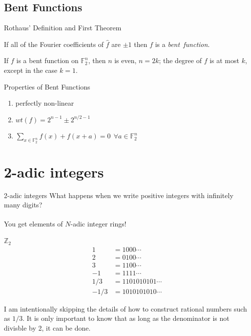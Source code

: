 \documentclass{beamer}
\def\zzz{\mathbb{Z}}
\def\gftwo{\mathbb{F}_2}
\begin{document}
\subsection{Bent Functions}
\begin{frame}{Rothaus' Definition and First Theorem}
  \begin{definition}\label{def:bent-function}
    If all of the Fourier coefficients of $\hat{f}$ are $\pm1$ then
    $f$ is a {\em bent\ function}.
  \end{definition}
  \begin{theorem}\label{thm:deg-of-bent-function}
  	If $f$ is a bent function on $\gftwo^n$, then $n$ is even, $n=2k$;
  	the degree of $f$ is at most $k$, except in the case $k=1$.
  \end{theorem}
\end{frame}

\begin{frame}{Properties of Bent Functions}
  \begin{enumerate}[1.]
    \item perfectly non-linear
    \item $wt(f)=2^{n-1}\pm2^{n/2-1}$
    \item $\sum_{x\in\gftwo^n}{f(x)+f(x+a)}=0 \ \ \forall a\in\gftwo^n$
  \end{enumerate}
\end{frame}

\section{2-adic integers}
\begin{frame}{2-adic integers}
  What happens when we write positive integers with infinitely many digits? \\
  \ \\
  \pause
  You get elements of $N$-adic integer rings!
\end{frame}

\begin{frame}{$\zzz_2$}
  \begin{align*}
    1&=1000\cdots\\
    2&=0100\cdots\\
    3&=1100\cdots\\
    -1&=1111\cdots\\
    1/3&=1101010101\cdots\\
    -1/3&=1010101010\cdots
  \end{align*}
  \par I am intentionally skipping the details of how to construct rational
  numbers such as $1/3$. It is only important to know that as long as the
  denominator is not divisble by 2, it can be done.
\end{frame}
\end{document}
